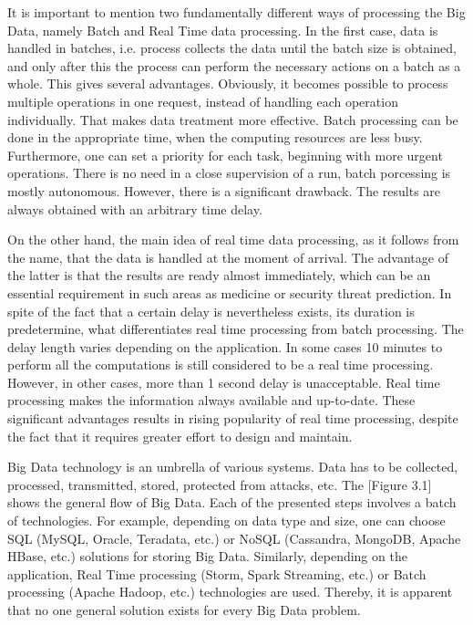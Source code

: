 It is important to mention two fundamentally different ways of processing the Big Data, namely Batch and Real Time data processing.
In the first case, data is handled in batches, i.e. process collects the data until the batch size is obtained, and only after this the process can perform the necessary actions on a batch as a whole.
This gives several advantages.
Obviously, it becomes possible to process multiple operations in one request, instead of handling each operation individually.
That makes data treatment more effective. 
Batch processing can be done in the appropriate time, when the computing resources are less busy.
Furthermore, one can set a priority for each task, beginning with more urgent operations.
There is no need in a close supervision of a run, batch porcessing is mostly autonomous.
However, there is a significant drawback.
The results are always obtained with an arbitrary time delay.

On the other hand, the main idea of real time data processing, as it follows from the name, that the data is handled at the moment of arrival.
The advantage of the latter is that the results are ready almost immediately, which can be an essential requirement in such areas as medicine or security threat prediction. 
In spite of the fact that a certain delay is nevertheless exists, its duration is predetermine, what differentiates real time processing from batch processing.
The delay length varies depending on the application.
In some cases 10 minutes to perform all the computations is still considered to be a real time processing.
However, in other cases, more than 1 second delay is unacceptable.
Real time processing makes the information always available and up-to-date.
These significant advantages results in rising popularity of real time processing, despite the fact that it requires greater effort to design and maintain.

Big Data technology is an umbrella of various systems. 
Data has to be collected, processed, transmitted, stored, protected from attacks, etc.
The [Figure 3.1] shows the general flow of Big Data.
Each of the presented steps involves a batch of technologies.
For example, depending on data type and size, one can choose SQL (MySQL, Oracle, Teradata, etc.) or NoSQL (Cassandra, MongoDB, Apache HBase, etc.) solutions for storing Big Data.
Similarly, depending on the application, Real Time processing (Storm, Spark Streaming, etc.) or Batch processing (Apache Hadoop, etc.) technologies are used. 
Thereby, it is apparent that no one general solution exists for every Big Data problem.

